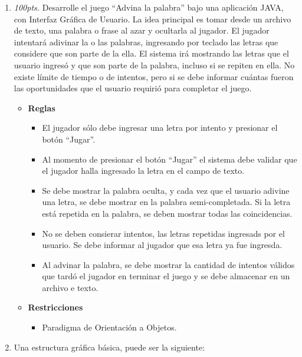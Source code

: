 \documentclass[10pt]{article}
\begin{document}
\begin{enumerate}
    \item \emph{100pts.} Desarrolle el juego ``Advina la palabra'' bajo una aplicaci\'on JAVA, con Interfaz Gr\'afica de Usuario. La idea principal es tomar desde un archivo de texto, una palabra o frase al azar y ocultarla al jugador. El jugador intentar\'a adivinar la o las palabras, ingresando por teclado las letras que considere que son parte de la ella. El sistema ir\'a mostrando las letras que el usuario ingres\'o y que son parte de la palabra, incluso si se repiten en ella. No existe l\'imite de tiempo o de intentos, pero si se debe informar cu\'antas fueron las oportunidades que el usuario requiri\'o para completar el juego.

    \begin{itemize}
        \item \textbf{Reglas}
        \begin{itemize}
            \item El jugador s\'olo debe ingresar una letra por intento y presionar el bot\'on ``Jugar''.
            \item Al momento de presionar el bot\'on ``Jugar'' el sistema debe validar que el jugador halla ingresado la letra en el campo de texto.
            \item Se debe mostrar la palabra oculta, y cada vez que el usuario adivine una letra, se debe mostrar en la palabra semi-completada. Si la letra est\'a repetida en la palabra, se deben mostrar todas las coincidencias.
            \item No se deben consierar intentos, las letras repetidas ingresads por el usuario. Se debe informar al jugador que esa letra ya fue ingresda.
            \item Al advinar la palabra, se debe mostrar la cantidad de intentos v\'alidos que tard\'o el jugador en terminar el juego y se debe almacenar en un archivo e texto.
        \end{itemize} 
        \item \textbf{Restricciones}
        \begin{itemize}
            \item Paradigma de Orientaci\'on a Objetos.
        \end{itemize} 
            \end{itemize}    
        \item[] Una estructura gr\'afica b\'asica, puede ser la siguiente:
        

\end{enumerate}
\end{document}
